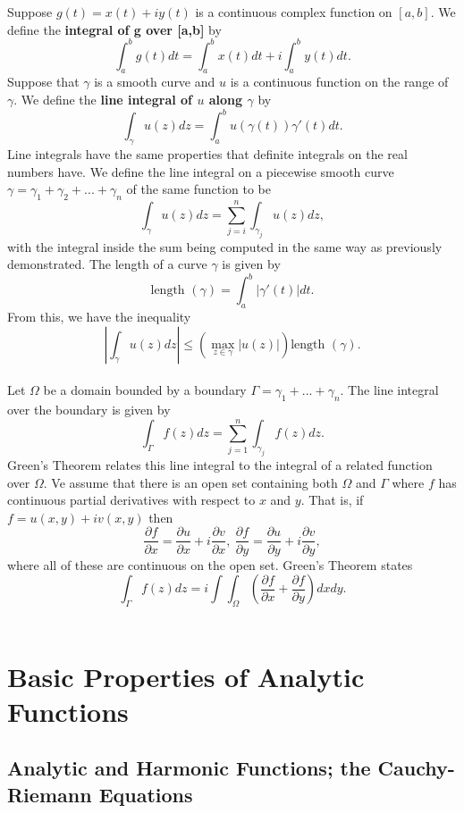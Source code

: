 \documentclass[12pt,letterpaper]{article}
\begin{document}
Suppose \(g(t) = x(t) + iy(t)\) is a continuous complex function on \([a,b]\). We define the \textbf{integral of g over [a,b]} by \[\int_{a}^{b} g(t)dt = \int_{a}^{b} x(t)dt + i\int_{a}^{b} y(t)dt.\] Suppose that \(\gamma\) is a smooth curve and \(u\) is a continuous function on the range of \(\gamma\). We define the \textbf{line integral of \(u\) along \(\gamma\)} by \[\int_{\gamma} u(z)dz = \int_{a}^{b} u(\gamma(t))\gamma'(t)dt.\] Line integrals have the same properties that definite integrals on the real numbers have. We define the line integral on a piecewise smooth curve \(\gamma = \gamma_{1}+\gamma_{2}+...+\gamma_{n}\) of the same function to be \[\int_{\gamma} u(z)dz = \sum_{j=i}^{n} \int_{\gamma_{j}} u(z)dz,\] with the integral inside the sum being computed in the same way as previously demonstrated. The length of a curve \(\gamma\) is given by \[\text{length }(\gamma) = \int_{a}^{b} |\gamma'(t)|dt.\] From this, we have the inequality \[\left|\int_{\gamma} u(z)dz\right| \leq \left(\max_{z \in \gamma}|u(z)|\right) \text{length }(\gamma).\] \\

Let \(\Omega\) be a domain bounded by a boundary \(\Gamma = \gamma_{1}+...+\gamma_{n}\). The line integral over the boundary is given by \[\int_{\Gamma} f(z)dz = \sum_{j=1}^{n} \int_{\gamma_{j}} f(z)dz.\] Green's Theorem relates this line integral to the integral of a related function over \(\Omega\). Ve assume that there is an open set containing both \(\Omega\) and \(\Gamma\) where \(f\) has continuous partial derivatives with respect to \(x\) and \(y\). That is, if \(f = u(x,y) + iv(x,y)\) then \[\frac{\partial f}{\partial x} = \frac{\partial u}{\partial x} + i\frac{\partial v}{\partial x},\ \frac{\partial f}{\partial y} = \frac{\partial u}{\partial y} + i\frac{\partial v}{\partial y},\] where all of these are continuous on the open set. Green's Theorem states \[\int_{\Gamma} f(z)dz = i\int \int_{\Omega} \left( \frac{\partial f}{\partial x} + \frac{\partial f}{\partial y}\right)dxdy.\] \\

\pagebreak

\section{Basic Properties of Analytic Functions}

\subsection{Analytic and Harmonic Functions; the Cauchy-Riemann Equations}
\end{document}
